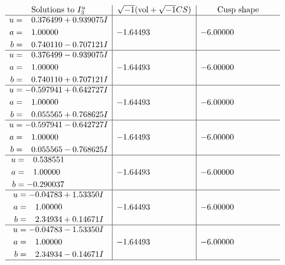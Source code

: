 \documentclass[1p]{elsarticle_modified}
\theoremstyle{definition}
\newcommand{\I}{\sqrt{-1}}
\begin{document}
$$\begin{array}{c|c|c}  
\text{Solutions to }I^u_{3}& \I (\text{vol} + \sqrt{-1}CS) & \text{Cusp shape}\\
 \hline 
\begin{aligned}
u &= \phantom{-}0.376499 + 0.939075 I \\
a &= \phantom{-}1.00000\phantom{ +0.000000I} \\
b &= \phantom{-}0.740110 - 0.707121 I\end{aligned}
 & -1.64493\phantom{ +0.000000I} & -6.00000\phantom{ +0.000000I} \\ \hline\begin{aligned}
u &= \phantom{-}0.376499 - 0.939075 I \\
a &= \phantom{-}1.00000\phantom{ +0.000000I} \\
b &= \phantom{-}0.740110 + 0.707121 I\end{aligned}
 & -1.64493\phantom{ +0.000000I} & -6.00000\phantom{ +0.000000I} \\ \hline\begin{aligned}
u &= -0.597941 + 0.642727 I \\
a &= \phantom{-}1.00000\phantom{ +0.000000I} \\
b &= \phantom{-}0.055565 + 0.768625 I\end{aligned}
 & -1.64493\phantom{ +0.000000I} & -6.00000\phantom{ +0.000000I} \\ \hline\begin{aligned}
u &= -0.597941 - 0.642727 I \\
a &= \phantom{-}1.00000\phantom{ +0.000000I} \\
b &= \phantom{-}0.055565 - 0.768625 I\end{aligned}
 & -1.64493\phantom{ +0.000000I} & -6.00000\phantom{ +0.000000I} \\ \hline\begin{aligned}
u &= \phantom{-}0.538551\phantom{ +0.000000I} \\
a &= \phantom{-}1.00000\phantom{ +0.000000I} \\
b &= -0.290037\phantom{ +0.000000I}\end{aligned}
 & -1.64493\phantom{ +0.000000I} & -6.00000\phantom{ +0.000000I} \\ \hline\begin{aligned}
u &= -0.04783 + 1.53350 I \\
a &= \phantom{-}1.00000\phantom{ +0.000000I} \\
b &= \phantom{-}2.34934 + 0.14671 I\end{aligned}
 & -1.64493\phantom{ +0.000000I} & -6.00000\phantom{ +0.000000I} \\ \hline\begin{aligned}
u &= -0.04783 - 1.53350 I \\
a &= \phantom{-}1.00000\phantom{ +0.000000I} \\
b &= \phantom{-}2.34934 - 0.14671 I\end{aligned}
 & -1.64493\phantom{ +0.000000I} & -6.00000\phantom{ +0.000000I}\\
 \hline 
 \end{array}$$\newpage
\end{document}
